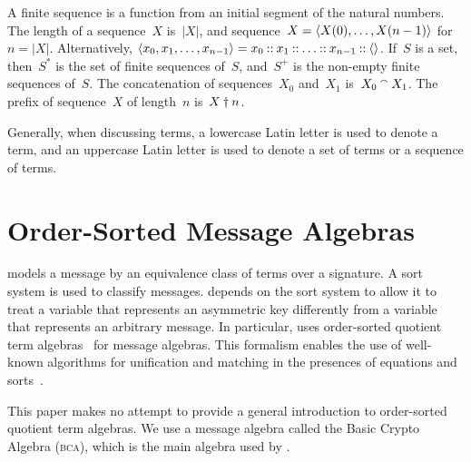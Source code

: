 \documentclass[12pt]{report}
\theoremstyle{definition}
\newcommand{\bca}{\textsc{bca}}
\begin{document}
A finite sequence is a function from an initial
segment of the natural numbers.  The length of a sequence~$X$ is~$|X|$,
and sequence~$X=\langle X(0),\ldots,X(n-1)\rangle$ for $n=|X|$.  Alternatively,
$\langle x_0,x_1,\ldots,x_{n-1}\rangle =x_0\mathbin{::} x_1\mathbin{::}\ldots\mathbin{::}
x_{n-1}\mathbin{::}\langle\rangle$.  If~$S$ is a set, then~$S^\ast$ is the set of finite
sequences of~$S$, and~$S^+$ is the non-empty finite sequences of~$S$.
The concatenation of sequences~$X_0$ and~$X_1$ is~$X_0\mathbin{{}^\smallfrown} X_1$.
The prefix of sequence~$X$ of length~$n$ is~$X\dagger n$.

Generally, when discussing terms, a lowercase Latin letter is used to
denote a term, and an uppercase Latin letter is used to denote a set
of terms or a sequence of terms.

\chapter{Order-Sorted Message Algebras}\label{chp:order-sorted mesg algs}

{\cpsa} models a message by an equivalence class of terms over a
signature. A sort system is used to classify messages.  {\cpsa}
depends on the sort system to allow it to treat a variable that
represents an asymmetric key differently from a variable that
represents an arbitrary message.  In particular, {\cpsa} uses
order-sorted quotient term algebras~\cite{GoguenMeseguer92} for
message algebras.  This formalism enables the use of well-known
algorithms for unification and matching in the presences of equations
and sorts~\cite{BaaderSnyder01}.

This paper makes no attempt to provide a general introduction to
order-sorted quotient term algebras.  We use a message algebra called
the Basic Crypto Algebra (\bca), which is the main algebra used by
{\cpsa}.
\end{document}
